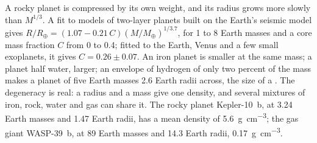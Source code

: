 A rocky planet is compressed by its own weight, and its radius grows
more slowly than $M^{1/3}$. A fit to models of two-layer planets built on
the Earth's seismic model gives $R/R_\oplus = (1.07 - 0.21\,C)
(M/M_\oplus)^{1/3.7}$, for 1 to 8 Earth masses and a core mass fraction
$C$ from 0 to 0.4; fitted to the Earth, Venus and a few small
exoplanets, it gives $C = 0.26 \pm 0.07$. An
iron planet is smaller at the same mass; a planet half water, larger;
an envelope of hydrogen of only two percent of the mass makes a planet of
five Earth masses \num{2.6} Earth radii across, the size of a
. The degeneracy is real: a radius and a mass give one
density, and several mixtures of iron, rock, water and gas can share it.
The rocky planet Kepler-10~b, at 3.24 Earth masses and 1.47 Earth radii,
has a mean density of \qty{5.6}{g.cm^{-3}}; the gas giant WASP-39~b,
at 89 Earth masses and 14.3 Earth radii, \qty{0.17}{g.cm^{-3}}.

